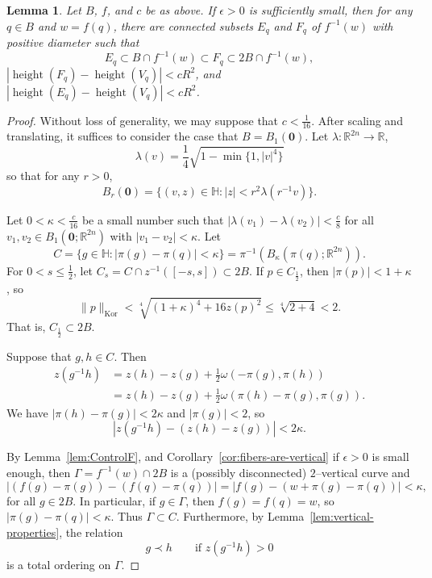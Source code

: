 \documentclass[12pt,reqno]{amsart}
\DeclareMathOperator{\height}{height}
\newcommand{\HH}{\mathbb{H}}
\newcommand{\R}{\mathbb{R}}
\newcommand{\zero}{\mathbf{0}}
\newcommand{\from}{\colon}
\newtheorem{lemma}[thm]{Lemma}
\theoremstyle{remark}
\newcommand{\0}{\mathbf{0}}
\renewcommand{\1}{\mathbf 1}
\DeclareMathOperator{\Kor}{Kor}
\begin{document}
\begin{lemma}\label{lem:sandwich}
  Let $B$, $f$, and $c$ be as above. If $\epsilon >0$ is sufficiently small, then for any $q\in B$ and $w=f(q)$, there are connected subsets $E_q$ and $F_q$ of $f^{-1}(w)$ with positive diameter such that
  $$E_q \subset B\cap f^{-1}(w) \subset F_q\subset 2B\cap f^{-1}(w)
  ,
  $$
  $|\height(F_q) - \height(V_q)| < c R^2$, and $|\height(E_q) - \height(V_q)| < cR^2$. 
\end{lemma} 
\begin{proof}
  Without loss of generality, we may suppose that $c < \frac{1}{16}$. After scaling and translating, it suffices to consider the case that $B=B_1(\zero)$.
  Let $\lambda\from \R^{2n}\to \R$,
  \begin{equation}\label{eq:def-lambda-fn}
    \lambda(v) = \frac{1}{4}\sqrt{1 - \min\{1,|v|^4\}}
  \end{equation}
  so that for any $r > 0$, 
  $$B_r(\zero) = \{(v,z)\in \HH : |z| < r^2 \lambda(r^{-1} v)\}.$$
  
  Let $0<\kappa < \frac{c}{16}$ be a small number such that $|\lambda(v_1) - \lambda(v_2)| < \frac{c}{8}$ for all $v_1,v_2 \in B_1(\zero;\R^{2n})$ with $|v_1 - v_2| < \kappa$.
  Let
  $$C = \{g\in \HH : |\pi(g) - \pi(q)| < \kappa\} = \pi^{-1}(B_\kappa(\pi(q);\R^{2n})).$$
  For $0 < s \le \frac{1}{2}$, let $C_s = C\cap z^{-1}([-s,s]) \subset 2B$. If $p\in C_{\frac{1}{2}}$, then $|\pi(p)| < 1 + \kappa$, so
  $$\|p\|_{\Kor} < \sqrt[4]{(1+\kappa)^4 + 16 z(p)^2} \le \sqrt[4]{2 + 4} < 2.$$
  That is, $C_{\frac{1}{2}}\subset 2B$.

  Suppose that $g, h \in C$. Then
  \[
  \begin{aligned}
  z(g^{-1}h) &= z(h) - z(g) + \frac{1}{2} \omega(-\pi(g), \pi(h)) \\
  &= z(h) - z(g) + \frac{1}{2} \omega(\pi(h)-\pi(g), \pi(g)).
  \end{aligned}
  \]
  We have $|\pi(h)-\pi(g)| < 2\kappa$ and $|\pi(g)|< 2$, so
  \begin{equation}\label{eq:gh-height}
    |z(g^{-1}h) - (z(h)-z(g))| < 2\kappa.
  \end{equation}

  By Lemma~\ref{lem:ControlF}, and Corollary~\ref{cor:fibers-are-vertical} if $\epsilon>0$ is small enough, then $\Gamma = f^{-1}(w)\cap 2B$ is a (possibly disconnected) $2$--vertical curve and
  \begin{equation}\label{eq:displace}
    |(f(g) - \pi(g)) - (f(q) - \pi(q))| = |f(g) - (w + \pi(g) - \pi(q))| < \kappa, 
  \end{equation}
  for all $g\in 2B$. 
  In particular, if $g\in \Gamma$, then $f(g) = f(q) = w$, so $|\pi(g) - \pi(q)| < \kappa$. Thus $\Gamma \subset C$.
  Furthermore, by Lemma~\ref{lem:vertical-properties}, the relation
  $$g \prec h \qquad \text{if $z(g^{-1}h) > 0$}$$
  is a total ordering on $\Gamma$.


\end{proof}
\end{document}
